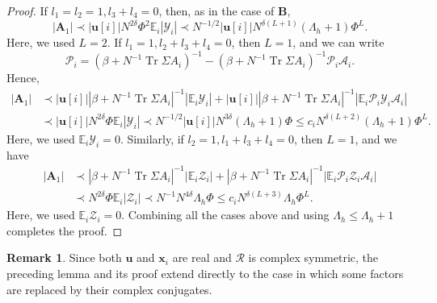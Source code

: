 \documentclass[11pt,reqno]{amsart}
\def\u{\mathbf{u}}
\def\x{\mathbf{x}}
\def\E{\mathbb{E}}
\def\cA{\mathcal{A}}
\def\cY{\mathcal{Y}}
\def\cZ{\mathcal{Z}}
\def\cP{\mathcal{P}}
\def\cR{\mathcal{R}}
\def\Tr{\operatorname{Tr}}
\theoremstyle{definition}
\newtheorem{remark}[theorem]{Remark}
\numberwithin{equation}{section}
\numberwithin{figure}{section}
\begin{document}
\begin{proof}
If $l_1=l_2=1,l_3+l_4=0$, then, as in the case of $\mathbf{B}$,
\[
    |\mathbf{A}_1|\prec|\u[i]| N^{2\delta}\Phi^2\E_i|\cY_i|\prec N^{-1/2}|\u[i]|N^{\delta(L+1)}(\Lambda_h+1)\Phi^L.
\]
Here, we used $L=2$. If $l_1=1,l_2+l_3+l_4=0$, then $L=1$, and we can write
\[
    \cP_i=(\beta+N^{-1}\Tr\Sigma A_i)^{-1}-(\beta+N^{-1}\Tr\Sigma A_i)^{-1}\cP_i\cA_i.
\]
Hence,
\begin{align*}
    |\mathbf{A}_1|&\prec|\u[i]||\beta+N^{-1}\Tr\Sigma A_i|^{-1}|\E_i\cY_i|+|\u[i]||\beta+N^{-1}\Tr\Sigma A_i|^{-1}|\E_i\cP_i\cY_i\cA_i|\\
    &\prec |\u[i]|N^{2\delta}\Phi\E_i|\cY_i|\prec N^{-1/2}|\u[i]|N^{3\delta}(\Lambda_h+1)\Phi\leq c_i N^{\delta(L+2)}(\Lambda_h+1)\Phi^L.
\end{align*}
Here, we used $\E_i\cY_i=0$. Similarly, if $l_2=1,l_1+l_3+l_4=0$, then $L=1$, and we have
\begin{align*}
    |\mathbf{A}_1|&\prec |\beta+N^{-1}\Tr\Sigma A_i|^{-1}|\E_i\cZ_i|+|\beta+N^{-1}\Tr\Sigma A_i|^{-1}|\E_i\cP_i\cZ_i\cA_i|\\
    &\prec N^{2\delta}\Phi\E_i|\cZ_i|\prec N^{-1}N^{4\delta}\Lambda_h\Phi\leq c_i N^{\delta(L+3)}\Lambda_h\Phi^L.
\end{align*}
Here, we used $\E_i\cZ_i=0$. Combining all the cases above and using $\Lambda_h\leq\Lambda_h+1$ completes the proof.
\end{proof}

\begin{remark}\label{remk:complex-conjugate}
Since both $\u$ and $\x_i$ are real and $\cR$ is complex symmetric, the preceding lemma and its proof extend directly to the case in which some factors are replaced by their complex conjugates.
\end{remark}
\end{document}

